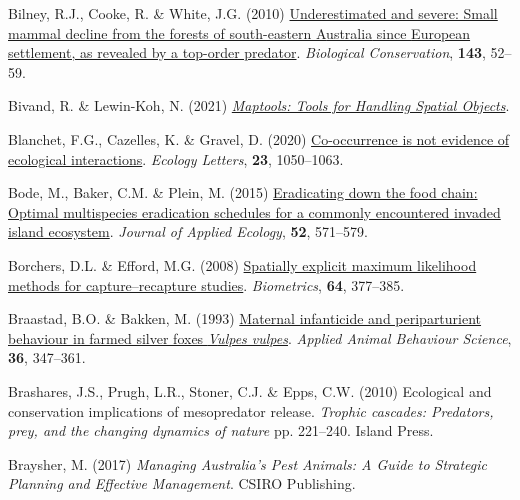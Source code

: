 \documentclass[11pt,a4paper,titlepage,twoside,openright]{style/unimelbthesis}
\newenvironment{CSLReferences}%
  {}%
  {\par}
\begin{document}
\begin{mainmatter}
\begin{CSLReferences}{1}{0}
\leavevmode{}%
Bilney, R.J., Cooke, R. \& White, J.G. (2010) \href{https://doi.org/10.1016/j.biocon.2009.09.002}{Underestimated and severe: Small mammal decline from the forests of south-eastern {{A}ustralia} since {European} settlement, as revealed by a top-order predator}. \emph{Biological Conservation}, \textbf{143}, 52--59.

\leavevmode{}%
Bivand, R. \& Lewin-Koh, N. (2021) \emph{\href{https://CRAN.R-project.org/package=maptools}{Maptools: Tools for Handling Spatial Objects}}.

\leavevmode{}%
Blanchet, F.G., Cazelles, K. \& Gravel, D. (2020) \href{https://doi.org/10.1111/ele.13525}{Co-occurrence is not evidence of ecological interactions}. \emph{Ecology Letters}, \textbf{23}, 1050--1063.

\leavevmode{}%
Bode, M., Baker, C.M. \& Plein, M. (2015) \href{https://doi.org/10.1111/1365-2664.12429}{Eradicating down the food chain: Optimal multispecies eradication schedules for a commonly encountered invaded island ecosystem}. \emph{Journal of Applied Ecology}, \textbf{52}, 571--579.

\leavevmode{}%
Borchers, D.L. \& Efford, M.G. (2008) \href{https://doi.org/10.1111/j.1541-0420.2007.00927.x}{Spatially explicit maximum likelihood methods for capture--recapture studies}. \emph{Biometrics}, \textbf{64}, 377--385.

\leavevmode{}%
Braastad, B.O. \& Bakken, M. (1993) \href{https://doi.org/10.1016/0168-1591(93)90132-9}{Maternal infanticide and periparturient behaviour in farmed silver foxes \emph{{V}ulpes vulpes}}. \emph{Applied Animal Behaviour Science}, \textbf{36}, 347--361.

\leavevmode{}%
Brashares, J.S., Prugh, L.R., Stoner, C.J. \& Epps, C.W. (2010) Ecological and conservation implications of mesopredator release. \emph{Trophic cascades: Predators, prey, and the changing dynamics of nature} pp. 221--240. {Island Press}.

\leavevmode{}%
Braysher, M. (2017) \emph{Managing {A}ustralia's Pest Animals: A Guide to Strategic Planning and Effective Management}. {CSIRO Publishing}.


\end{CSLReferences}
\end{mainmatter}
\end{document}
